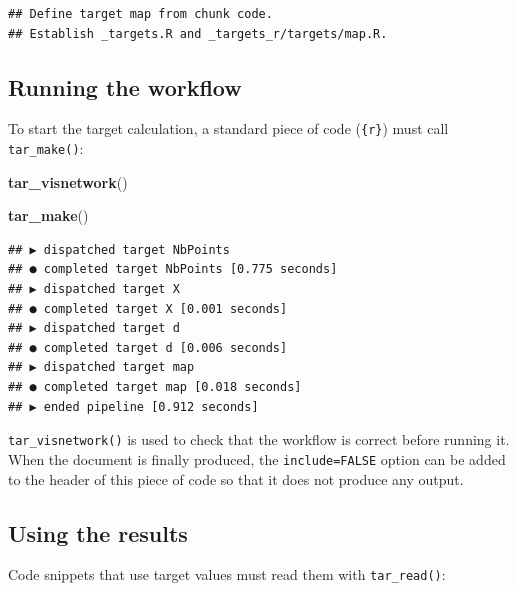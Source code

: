 \documentclass[
  12pt,
  american,
  a4paper,
  extrafontsizes,onecolumn,openright
  ]{memoir}
\newenvironment{Shaded}{\begin{snugshade}}{\end{snugshade}}
\newcommand{\FunctionTok}[1]{\textcolor[rgb]{0.13,0.29,0.53}{\textbf{#1}}}
\newcommand{\NormalTok}[1]{#1}
\begin{document}
\begin{verbatim}
## Define target map from chunk code.
## Establish _targets.R and _targets_r/targets/map.R.
\end{verbatim}

\normalsize

\subsection{Running the workflow}\label{running-the-workflow}

To start the target calculation, a standard piece of code (\texttt{\{r\}}) must call \texttt{tar\_make()}:

\scriptsize

\begin{Shaded}
\begin{Highlighting}[]
\FunctionTok{tar\_visnetwork}\NormalTok{()}
\end{Highlighting}
\end{Shaded}

\begin{Shaded}
\begin{Highlighting}[]
\FunctionTok{tar\_make}\NormalTok{()}
\end{Highlighting}
\end{Shaded}

\begin{verbatim}
## ▶ dispatched target NbPoints
## ● completed target NbPoints [0.775 seconds]
## ▶ dispatched target X
## ● completed target X [0.001 seconds]
## ▶ dispatched target d
## ● completed target d [0.006 seconds]
## ▶ dispatched target map
## ● completed target map [0.018 seconds]
## ▶ ended pipeline [0.912 seconds]
\end{verbatim}

\normalsize

\texttt{tar\_visnetwork()} is used to check that the workflow is correct before running it.
When the document is finally produced, the \texttt{include=FALSE} option can be added to the header of this piece of code so that it does not produce any output.

\subsection{Using the results}\label{using-the-results}

Code snippets that use target values must read them with \texttt{tar\_read()}:

\scriptsize
\end{document}
